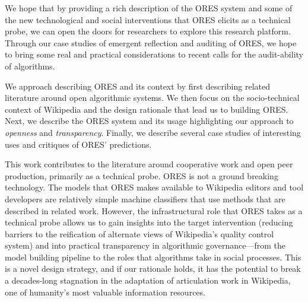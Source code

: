 We hope that by providing a rich description of the ORES system and some of the new technological and social interventions that ORES elicits as a technical probe\cite{hutchinson2003technology}, we can open the doors for researchers to explore this research platform\cite{terveen2014study}.  Through our case studies of emergent reflection and auditing of ORES, we hope to bring some real and practical considerations to recent calls for the audit-ability of algorithms\cite{sandvig2014auditing}.

We approach describing ORES and its context by first describing related literature around open algorithmic systems.  We then focus on the socio-technical context of Wikipedia and the design rationale that lead us to building ORES.  Next, we describe the ORES system and its usage highlighting our approach to \emph{openness} and \emph{transparency}.  Finally, we describe several case studies of interesting uses and critiques of ORES' predictions.

This work contributes to the literature around cooperative work and open peer production, primarily as a technical probe.  ORES is not a ground breaking technology.  The models that ORES makes available to Wikipedia editors and tool developers are relatively simple machine classifiers that use methods that are described in related work.  However, the infrastructural role that ORES takes as a technical probe allows us to gain insights into the target intervention (reducing barriers to the reification of alternate views of Wikipedia's quality control system) and into practical transparency in algorithmic governance---from the model building pipeline to the roles that algorithms take in social processes.  This is a novel design strategy, and if our rationale holds, it has the potential to break a decades-long stagnation in the adaptation of articulation work in Wikipedia, one of humanity's most valuable information resources.
